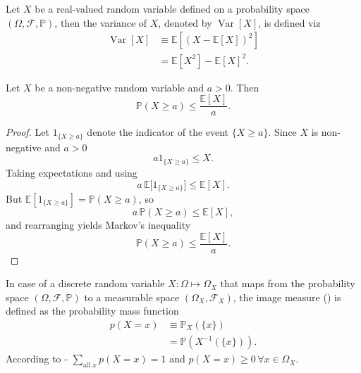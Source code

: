 \begin{definition}[Variance]
	\label{def:variance}
	Let $X$ be a real-valued random variable defined on a probability space $(\Omega, \mathcal{F},\mathbb{P})$, then the variance of $X$, denoted by $\operatorname{Var}[X]$, is defined viz
	\begin{equation}
		\begin{split}
			\operatorname{Var}[X]&\equiv \mathbb{E}[(X-\mathbb{E}[X])^2]\\
			&= \mathbb{E}[X^2]-\mathbb{E}[X]^2.
		\end{split}
	\end{equation}
\end{definition}

\begin{theorem}
Let $X$ be a non-negative random variable and $a > 0$. Then
\begin{equation}
\mathbb{P}(X \geq a) \leq \frac{\mathbb{E}[X]}{a}.
\end{equation}
\end{theorem}
\begin{proof}
	Let $1_{\{X\ge a\}}$ denote the indicator of the event $\{X\ge a\}$. Since $X$ is non-negative and $a>0$
	\begin{equation}
		a1_{\{X\ge a\}} \le X.
	\end{equation}
	Taking expectations and using 
	\begin{equation}
		a\,\mathbb{E}\big[1_{\{X\ge a\}}\big] \le \mathbb{E}[X].
	\end{equation}
	But $\mathbb{E}[1_{\{X\ge a\}}]=\mathbb{P}(X\ge a)$, so
	\begin{equation}
		a\,\mathbb{P}(X\ge a) \le \mathbb{E}[X],
	\end{equation}
	and rearranging yields Markov's inequality
	\begin{equation}
		\mathbb{P}(X\ge a) \le \frac{\mathbb{E}[X]}{a}.
	\end{equation}
\end{proof}

\begin{definition}
	\label{def:pmf}
	In case of a discrete random variable $X: \Omega \mapsto \Omega_X$ that maps from the probability space $(\Omega, \mathcal{F}, \mathbb{P})$ to a measurable space $(\Omega_X, \mathcal{F}_X)$, the image measure () is defined as the probability mass function
	\begin{equation}
		\begin{split}
			p( X = x) &\equiv  \mathbb{P}_X(\{x\})\\
			& = \mathbb{P}(X^{-1}(\{x\})).
		\end{split}
		\label{eq:disc}
	\end{equation}
	According to - $\sum_{\text{all }x} p(X=x) = 1$ and $p(X=x) \geq 0 \, \forall x\in \Omega_X$. 
\end{definition}

